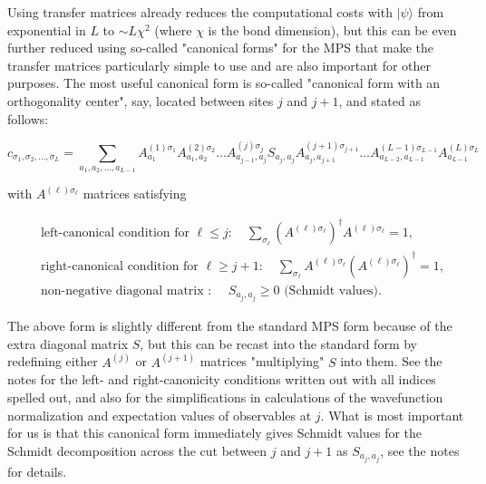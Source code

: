 \documentclass[12pt]{article}
\begin{document}
Using transfer matrices already reduces the computational costs with $|\psi\rangle$ from exponential in $L$ to $\sim L \chi^{2}$ (where $\chi$ is the bond dimension), but this can be even further reduced using so-called "canonical forms" for the MPS that make the transfer matrices particularly simple to use and are also important for other purposes. The most useful canonical form is so-called "canonical form with an orthogonality center", say, located between sites $j$ and $j+1$, and stated as follows:


\begin{equation*}
c_{\sigma_{1}, \sigma_{2}, \ldots, \sigma_{L}}=\sum_{a_{1}, a_{2}, \ldots, a_{L-1}} A_{a_{1}}^{(1) \sigma_{1}} A_{a_{1}, a_{2}}^{(2) \sigma_{2}} \ldots A_{a_{j-1}, a_{j}}^{(j) \sigma_{j}} S_{a_{j}, a_{j}} A_{a_{j}, a_{j+1}}^{(j+1) \sigma_{j+1}} \ldots A_{a_{L-2}, a_{L-1}}^{(L-1) \sigma_{L-1}} A_{a_{L-1}}^{(L) \sigma_{L}} \tag{21}
\end{equation*}


with $A^{(\ell) \sigma_{\ell}}$ matrices satisfying


\begin{align*}
& \text { left-canonical condition for } \ell \leq j: \quad \sum_{\sigma_{\ell}}\left(A^{(\ell) \sigma_{\ell}}\right)^{\dagger} A^{(\ell) \sigma_{\ell}}=1,  \tag{22}\\
& \text { right-canonical condition for } \ell \geq j+1: \quad \sum_{\sigma_{\ell}} A^{(\ell) \sigma_{\ell}}\left(A^{(\ell) \sigma_{\ell}}\right)^{\dagger}=1,  \tag{23}\\
& \text { non-negative diagonal matrix : } \quad S_{a_{j}, a_{j}} \geq 0 \text { (Schmidt values). } \tag{24}
\end{align*}


The above form is slightly different from the standard MPS form because of the extra diagonal matrix $S$, but this can be recast into the standard form by redefining either $A^{(j)}$ or $A^{(j+1)}$ matrices "multiplying" $S$ into them. See the notes for the left- and right-canonicity conditions written out with all indices spelled out, and also for the simplifications in calculations of the wavefunction normalization and expectation values of observables at $j$. What is most important for us is that this canonical form immediately gives Schmidt values for the Schmidt decomposition across the cut between $j$ and $j+1$ as $S_{a_{j}, a_{j}}$, see the notes for details.
\end{document}
